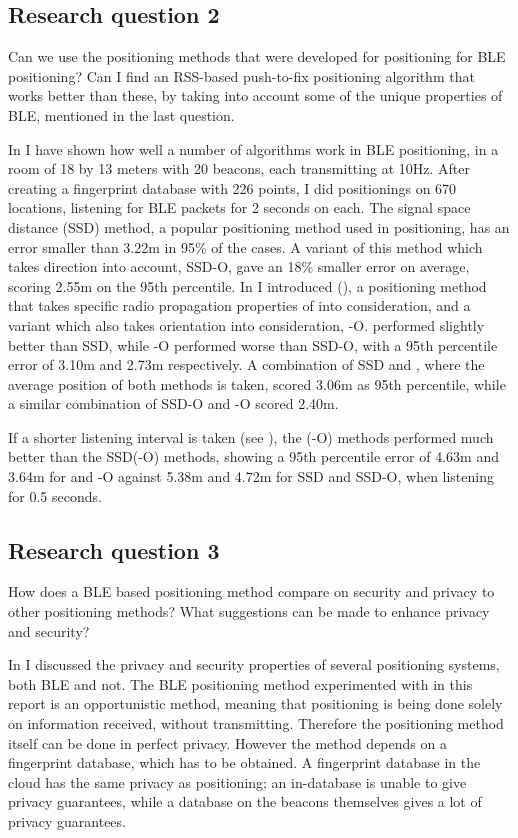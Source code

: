 \subsection{Research question 2}
\begin{em}
    Can we use the positioning methods that were developed for \wifi positioning for BLE positioning?
    Can I find an RSS-based push-to-fix positioning algorithm that works better than these, by taking into account some of the unique properties of BLE, mentioned in the last question.
\end{em}
In  I have shown how well a number of algorithms work in BLE positioning, in a room of 18 by 13 meters with 20 beacons, each transmitting at 10Hz.
After creating a fingerprint database with 226 points, I did positionings on 670 locations, listening for BLE packets for 2 seconds on each.
The signal space distance (SSD) method, a popular positioning method used in \wifi positioning, has an error smaller than 3.22m in 95\% of the cases.
A variant of this method which takes direction into account, SSD-O, gave an 18\% smaller error on average, scoring 2.55m on the 95th percentile.
In  I introduced \BRP (\aBRP), a positioning method that takes specific radio propagation properties of \BLE into consideration, and a variant which also takes orientation into consideration, \aBRP-O.
\aBRP performed slightly better than SSD, while \aBRP-O performed worse than SSD-O, with a 95th percentile error of 3.10m and 2.73m respectively.
A combination of SSD and \aBRP, where the average position of both methods is taken, scored 3.06m as 95th percentile, while a similar combination of SSD-O and \aBRP-O scored 2.40m.

If a shorter listening interval is taken (see ), the \aBRP(-O) methods performed much better than the SSD(-O) methods, showing a 95th percentile error of 4.63m and 3.64m for \aBRP and \aBRP-O against 5.38m and 4.72m for SSD and SSD-O, when listening for 0.5 seconds.

\subsection{Research question 3}
\begin{em}
    How does a BLE based positioning method compare on security and privacy to other positioning methods?
    What suggestions can be made to enhance privacy and security?
\end{em}
In  I discussed the privacy and security properties of several positioning systems, both BLE and not.
The BLE positioning method experimented with in this report is an opportunistic method, meaning that positioning is being done solely on information received, without transmitting.
Therefore the positioning method itself can be done in perfect privacy.
However the method depends on a fingerprint database, which has to be obtained.
A fingerprint database in the cloud has the same privacy as \wifi positioning; an in-\app database is unable to give privacy guarantees, while a database on the beacons themselves gives a lot of privacy guarantees.

